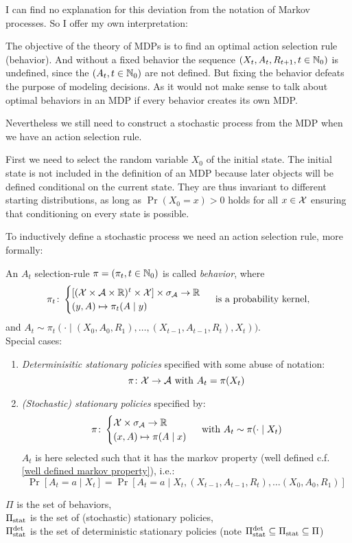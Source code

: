 I can find no explanation for this deviation from the notation of Markov processes. So I offer my own interpretation:

The objective of the theory of MDPs is to find an optimal action selection rule (behavior). And without a fixed behavior the sequence \((X_t, A_t, R_{t+1}, t\in\mathbb{N}_0 )\) is undefined, since the \((A_t,t\in\mathbb{N}_0)\) are not defined. But fixing the behavior defeats the purpose of modeling decisions. As it would not make sense to talk about optimal behaviors in an MDP if every behavior creates its own MDP.\vspace{1\baselineskip} 

Nevertheless we still need to construct a stochastic process from the MDP when we have an action selection rule. 

First we need to select the random variable \(X_0\) of the initial state. The initial state is not included in the definition of an MDP because later objects will be defined conditional on the current state. They are thus invariant to different starting distributions, as long as \(\Pr(X_0=x)>0\) holds for all \(x\in\mathcal{X}\) ensuring that conditioning on every state is possible.

To inductively define a stochastic process we need an action selection rule, more formally:

\begin{definition} An \(A_t\) selection-rule \(\pi=(\pi_t,t\in\mathbb{N}_0)\) is called \emph{behavior}, where
	\[ 
		\pi_t\colon
		\begin{cases}
			[(\mathcal{X}\times\mathcal{A}\times\mathbb{R})^t\times\mathcal{X}]\times\sigma_{\mathcal{A}} \to \mathbb{R} \\
			(y,A)\mapsto \pi_t(A\mid y)
		\end{cases} \text{ is a probability kernel,}
	\]
	and \(A_t\sim \pi_t(\cdot\mid (X_0,A_0,R_1), \dots,(X_{t-1},A_{t-1},R_t),X_t))\).\\
	Special cases:
	\begin{enumerate}
		\item \emph{Determinisitic stationary policies} specified with some abuse of notation:
		\[\leavevmode \pi\colon\cX\to\cA \text{ with }A_t=\pi(X_t)\]
		\item \emph{(Stochastic) stationary policies} specified by:
		\[\pi\colon \begin{cases}
		\mathcal{X}\times\sigma_{\mathcal{A}}\to\mathbb{R}\\
		(x,A)\mapsto \pi(A\mid x)
		\end{cases} \text{ with } A_t\sim\pi(\cdot\mid X_t) 
		\]
		\(A_t\) is here selected such that it has the markov property (well defined c.f. \ref{well defined markov property}), i.e.:
		\[\Pr[A_t=a\mid X_t]=\Pr[A_t=a\mid X_t, (X_{t-1},A_{t-1},R_t), \dots (X_0,A_0,R_1)] \]
	\end{enumerate}
	\(\Pi\) is the set of behaviors,\\
	\(\Pi_{\textnormal{stat}}\) is the set of (stochastic) stationary policies, \\
	\(\Pi_{\textnormal{stat}}^{\textnormal{det}}\) is the set of deterministic stationary policies (note \(\Pi_{\textnormal{stat}}^{\textnormal{det}}\subseteq\Pi_{\textnormal{stat}}\subseteq \Pi \))
\end{definition}

